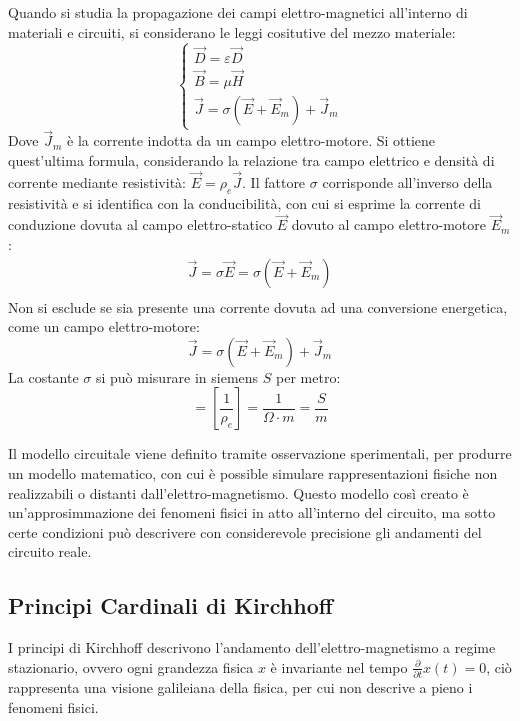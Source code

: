 \documentclass{article}
\numberwithin{equation}{subsection}
\begin{document}
Quando si studia la propagazione dei campi elettro-magnetici all'interno di materiali e circuiti, si considerano le leggi cositutive del mezzo materiale:
\begin{equation}
    \begin{cases}
        \vec{D}=\varepsilon\vec{D}\\
        \vec{B}=\mu\vec{H}\\
        \vec{J}=\sigma(\vec{E}+\vec{E}_m)+\vec{J}_m
    \end{cases}
\end{equation}
Dove $\vec{J}_m$ è la corrente indotta da un campo elettro-motore. Si ottiene quest'ultima formula, considerando la relazione tra campo elettrico e densità di corrente mediante 
resistività: $\vec{E}=\rho_e\vec{J}$. Il fattore $\sigma$ corrisponde all'inverso della resistività e si identifica con la conducibilità, con cui si esprime la corrente di conduzione dovuta al campo elettro-statico 
$\vec{E}$ dovuto al campo elettro-motore $\vec{E}_m$:  
\begin{gather*}
    \vec{J}=\sigma\vec{E}=\sigma(\vec{E}+\vec{E}_m)\\
\end{gather*}
Non si esclude se sia presente una corrente dovuta ad una conversione energetica, come un campo elettro-motore:
\begin{equation*}
    \vec{J}=\sigma(\vec{E}+\vec{E}_m)+\vec{J}_m
\end{equation*}
La costante $\sigma$ si può misurare in siemens $S$ per metro:
\begin{equation*}
    [\sigma]=\displaystyle\left[\frac{1}{\rho_e}\right]=\frac{1}{\Omega\cdot m}=\frac{S}{m}
\end{equation*}

Il modello circuitale viene definito tramite osservazione sperimentali, per produrre un modello matematico, con cui è possible simulare rappresentazioni fisiche non realizzabili 
o distanti dall'elettro-magnetismo. Questo modello così creato è un'approsimmazione dei fenomeni fisici in atto all'interno del circuito, ma sotto certe condizioni può 
descrivere con considerevole precisione gli andamenti del circuito reale. 

\subsection{Principi Cardinali di Kirchhoff}

I principi di Kirchhoff descrivono l'andamento dell'elettro-magnetismo a regime stazionario, ovvero ogni grandezza fisica $x$ è invariante nel tempo
$\displaystyle\frac{\partial }{\partial t}x(t)=0$, ciò rappresenta una visione galileiana della fisica, per cui non descrive a pieno i fenomeni fisici. 
\end{document}
